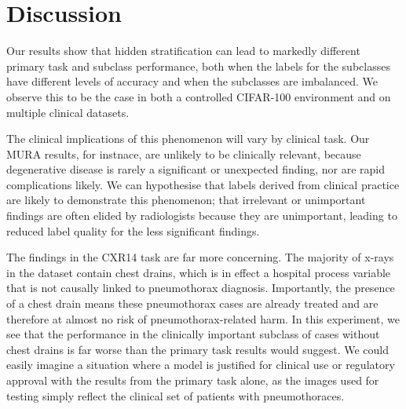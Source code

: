 \documentclass{article}
\begin{document}
%

\section{Discussion}

Our results show that hidden stratification can lead to markedly different primary task and subclass performance, both when the labels for the subclasses have different levels of accuracy and when the subclasses are imbalanced.  
We observe this to be the case in both a controlled CIFAR-100 environment and on multiple clinical datasets.

The clinical implications of this phenomenon will vary by clinical task. 
Our MURA results, for instnace, are unlikely to be clinically relevant, because degenerative disease is rarely a significant or unexpected finding, nor are rapid complications likely. 
We can hypothesise that labels derived from clinical practice are likely to demonstrate this phenomenon; that irrelevant or unimportant findings are often elided by radiologists because they are unimportant, leading to reduced label quality for the less significant findings.

The findings in the CXR14 task are far more concerning. 
The majority of x-rays in the dataset contain chest drains, which is in effect a hospital process variable that is not causally linked to pneumothorax diagnosis.
 Importantly, the presence of a chest drain means these pneumothorax cases are already treated and are therefore at almost no risk of pneumothorax-related harm. 
 In this experiment, we see that the performance in the clinically important subclass of cases without chest drains is far worse than the primary task results would suggest. 
 We could easily imagine a situation where a model is justified for clinical use or regulatory approval with the results from the primary task alone, as the images used for testing simply reflect the clinical set of patients with pneumothoraces.
 
\end{document}
